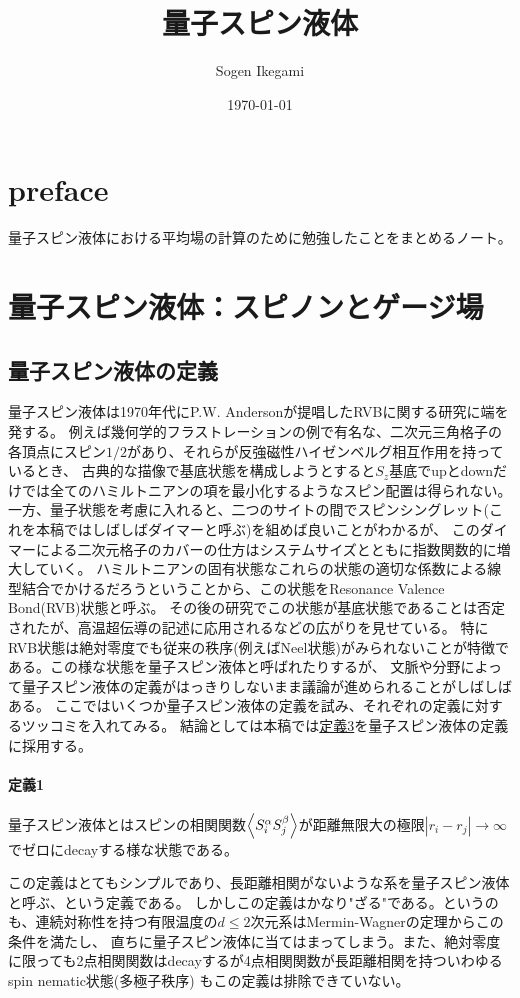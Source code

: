 \documentclass[11pt, aps, longbibliography]{article}
\begin{document}
\title{量子スピン液体}
\author{Sogen Ikegami}
\date{\today}
\maketitle

\tableofcontents

\section*{preface}
量子スピン液体における平均場の計算のために勉強したことをまとめるノート。

\section{量子スピン液体：スピノンとゲージ場}
    \subsection{量子スピン液体の定義}
        量子スピン液体は1970年代にP.W. Andersonが提唱したRVBに関する研究に端を発する。
        例えば幾何学的フラストレーションの例で有名な、二次元三角格子の各頂点にスピン$1/2$があり、それらが反強磁性ハイゼンベルグ相互作用を持っているとき、
        古典的な描像で基底状態を構成しようとすると$S_z$基底でupとdownだけでは全てのハミルトニアンの項を最小化するようなスピン配置は得られない。
        一方、量子状態を考慮に入れると、二つのサイトの間でスピンシングレット(これを本稿ではしばしばダイマーと呼ぶ)を組めば良いことがわかるが、
        このダイマーによる二次元格子のカバーの仕方はシステムサイズとともに指数関数的に増大していく。
        ハミルトニアンの固有状態なこれらの状態の適切な係数による線型結合でかけるだろうということから、この状態をResonance Valence Bond(RVB)状態と呼ぶ。
        その後の研究でこの状態が基底状態であることは否定されたが、高温超伝導の記述に応用されるなどの広がりを見せている。
        特にRVB状態は絶対零度でも従来の秩序(例えばNeel状態)がみられないことが特徴である。この様な状態を量子スピン液体と呼ばれたりするが、
        文脈や分野によって量子スピン液体の定義がはっきりしないまま議論が進められることがしばしばある。
        ここではいくつか量子スピン液体の定義を試み、それぞれの定義に対するツッコミを入れてみる。
        結論としては本稿では\hyperlink{def3}{定義3}を量子スピン液体の定義に採用する。

        \begin{tcolorbox}\hypertarget{def1}{}
            \paragraph{定義1}
            量子スピン液体とはスピンの相関関数$\expval{S_i^\alpha S_j^\beta}$が距離無限大の極限$|r_i-r_j|\rightarrow \infty$でゼロにdecayする様な状態である。
        \end{tcolorbox}
        この定義はとてもシンプルであり、長距離相関がないような系を量子スピン液体と呼ぶ、という定義である。
        しかしこの定義はかなり"ざる"である。というのも、連続対称性を持つ有限温度の$d\leq2$次元系はMermin-Wagnerの定理からこの条件を満たし、
        直ちに量子スピン液体に当てはまってしまう。また、絶対零度に限っても2点相関関数はdecayするが4点相関関数が長距離相関を持ついわゆるspin nematic状態(多極子秩序)
        もこの定義は排除できていない。
\end{document}
